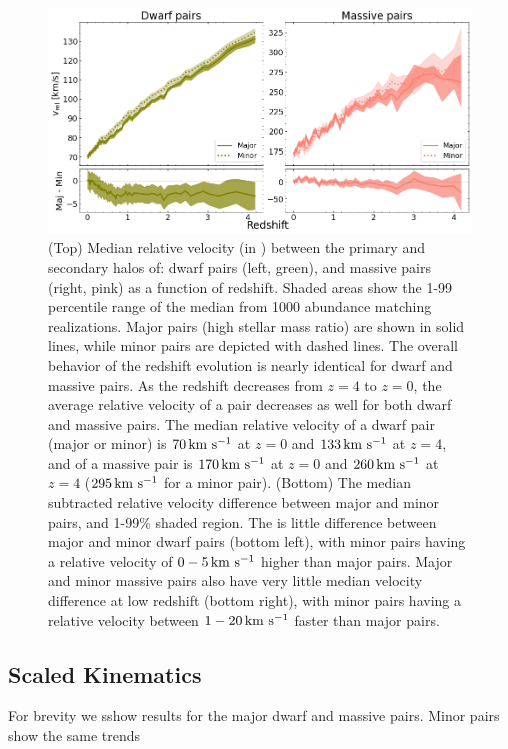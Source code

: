 \documentclass[twocolumn]{aastex631}
\begin{document}
\begin{figure}[htp]
  \centering
  \includegraphics[width=\textwidth]{vel_1000.png}
  \caption{
    (Top) Median relative velocity (in \kms) between the primary and secondary halos of: dwarf pairs (left, green), and massive pairs (right, pink) as a function of redshift. 
    Shaded areas show the 1-99 percentile range of the median from 1000 abundance matching realizations. Major pairs (high stellar mass ratio) are shown in solid lines, while minor pairs are depicted with dashed lines.
    The overall behavior of the redshift evolution is nearly identical for dwarf and massive pairs.
    As the redshift decreases from $z=4$ to $z=0$, the average relative velocity of a pair decreases as well for both dwarf and massive pairs.
    The median relative velocity of a dwarf pair (major or minor) is $70\,\mathrm{km}~\mathrm{s}^{-1}$ at $z=0$ and $133\,\mathrm{km}~\mathrm{s}^{-1}$ at $z=4$, and of a massive pair is $170\,\mathrm{km}~\mathrm{s}^{-1}$ at $z=0$ and $260\,\mathrm{km}~\mathrm{s}^{-1}$ at $z=4$ ($295\,\mathrm{km}~\mathrm{s}^{-1}$ for a minor pair). 
    (Bottom) The median subtracted relative velocity difference between major and minor pairs, and 1-99\% shaded region.
    The is little difference between major and minor dwarf pairs (bottom left), with minor pairs having a relative velocity of $0-5\,\mathrm{km}~\mathrm{s}^{-1}$ higher than major pairs. 
    Major and minor massive pairs also have very little median velocity difference at low redshift (bottom right), with minor pairs having a relative velocity between $1-20\,\mathrm{km}~\mathrm{s}^{-1}$ faster than major pairs.
    }
  \label{fig:vel}
\end{figure}




\subsection{Scaled Kinematics}\label{sec:results-scaled}
For brevity we sshow results for the major dwarf and massive pairs. Minor pairs show the same trends 
\end{document}
